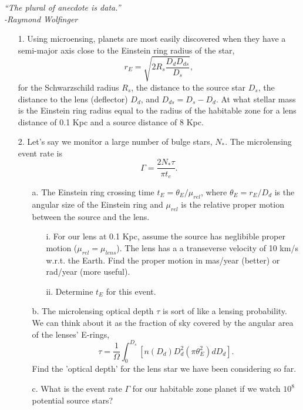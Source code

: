 \documentclass[12pt]{article}
\begin{document}
\raggedright
\begin{center}
\textit{``The plural of anecdote is data.''}\\
\hspace{20mm}\textit{-Raymond Wolfinger}
\end{center}

\begin{itemize}
\item[1.] Using microensing, planets are most easily discovered when they have a semi-major axis close to the Einstein ring radius of the star, 
\begin{equation}
r_E = \sqrt{2R_s\frac{D_dD_{ds}}{D_s}},
\end{equation}
for the Schwarzschild radius $R_s$,  the distance to the source star $D_s$, the distance to the lens (deflector) $D_d$, and $D_{ds}=D_s-D_d$. 
At what stellar mass is the Einstein ring radius equal to the radius of the habitable zone for a lens distance of 0.1 Kpc and a source distance of 8 Kpc. 

\item[2.] Let's say we monitor a large number of bulge stars, $N_*$. The microlensing event rate is 
\begin{equation}
\Gamma = \frac{2N_*\tau}{\pi t_e}.
\end{equation}
\begin{itemize}
\item[a.] The Einstein ring crossing time $t_E=\theta_E/\mu_{rel}$, where $\theta_E=r_E/D_d$ is the angular size of the Einstein ring and $\mu_{rel}$ is the relative proper motion between the source and the lens.
\begin{itemize}
\item[i.] For our lens at 0.1 Kpc, assume the source has neglibible proper motion ($\mu_{rel} = \mu_{lens}$). The lens has a a transeverse velocity of 10 km/s w.r.t. the Earth. Find the proper motion in mas/year (better) or rad/year (more useful).
\item[ii.] Determine $t_E$ for this event.
\end{itemize}
\item[b.] The microlensing optical depth $\tau$ is sort of like a lensing probability. We can think about it as the fraction of sky covered by the angular area of the lenses' E-rings,
\begin{equation}
\tau = \frac{1}{\Omega}\int_0^{D_s} \left[n(D_d)D_d^2(\pi\theta_E^2)dD_d\right].
\end{equation}
Find the 'optical depth' for the lens star we have been considering so far. 
\item[c.] What is the event rate $\Gamma$ for our habitable zone planet if we watch $10^8$ potential source stars?

\end{itemize}
\end{itemize}
\end{document}
